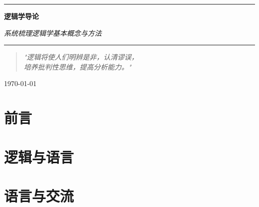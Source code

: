 



\begin{titlepage}
\centering
\vspace*{2cm}
{\color{black!80}\rule{\textwidth}{1pt}}
\vspace{1.5cm}

{\Huge\bfseries\color{black!90} 逻辑学导论 \par}
\vspace{0.5cm}
{\large\itshape 系统梳理逻辑学基本概念与方法 \par}

\vspace{1.5cm}
{\color{black!80}\rule{\textwidth}{1pt}}
\vspace{2cm}

\begin{minipage}{0.8\textwidth}
\centering
\begin{quotation}
\large\textit{"逻辑将使人们明辨是非，认清谬误，\\
培养批判性思维，提高分析能力。"}
\end{quotation}
\end{minipage}

\vfill

{\large \today \par}
\end{titlepage}

\frontmatter
\chapter*{前言}


\tableofcontents
\clearpage

\mainmatter

\chapter{逻辑与语言}













\chapter{语言与交流}








